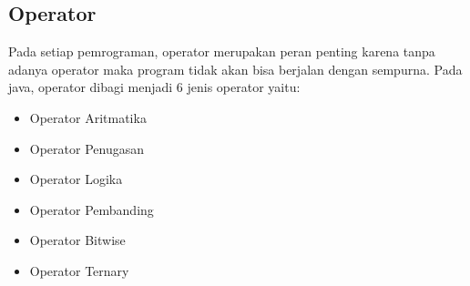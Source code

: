 \subsection{Operator}
Pada setiap pemrograman, operator merupakan peran penting karena tanpa adanya operator maka program tidak akan bisa berjalan dengan sempurna. Pada java, operator dibagi menjadi 6 jenis operator yaitu:
\begin{itemize}
    \item Operator Aritmatika
    \item Operator Penugasan
    \item Operator Logika
    \item Operator Pembanding 
    \item Operator Bitwise
    \item Operator Ternary
\end{itemize}

